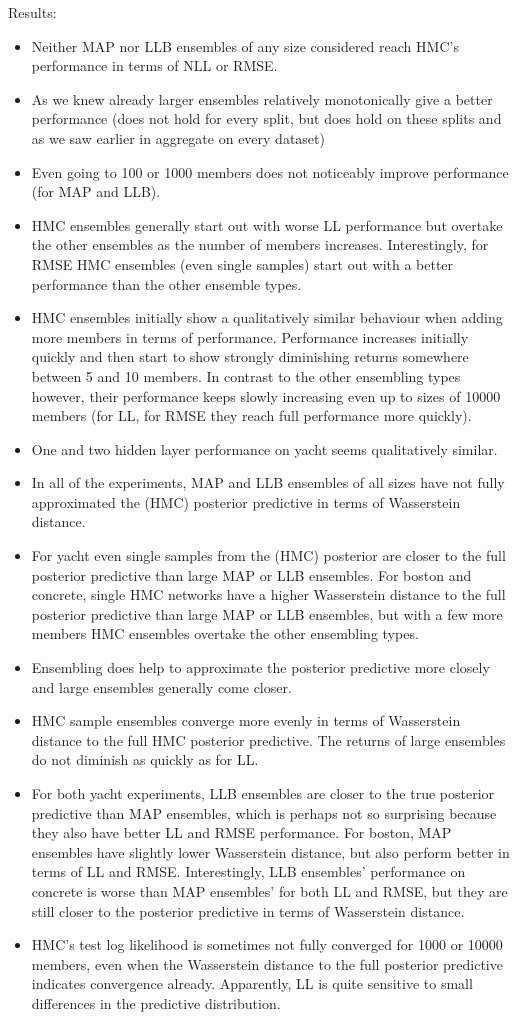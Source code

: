 \documentclass[../thesis.tex]{subfiles}
\begin{document}
Results:
\begin{itemize}
    \item Neither MAP nor LLB ensembles of any size considered reach HMC's performance in terms of NLL or RMSE.
    \item As we knew already larger ensembles relatively monotonically give a better performance (does not hold for every split, but does hold on these splits and as we saw earlier in aggregate on every dataset)
    \item Even going to 100 or 1000 members does not noticeably improve performance (for MAP and LLB).
    \item HMC ensembles generally start out with worse LL performance but overtake the other ensembles as the number of members increases. Interestingly, for RMSE HMC ensembles (even single samples) start out with a better performance than the other ensemble types.
    \item HMC ensembles initially show a qualitatively similar behaviour when adding more members in terms of performance. Performance increases initially quickly and then start to show strongly diminishing returns somewhere between 5 and 10 members. In contrast to the other ensembling types however, their performance keeps slowly increasing even up to sizes of 10000 members (for LL, for RMSE they reach full performance more quickly).
    \item One and two hidden layer performance on yacht seems qualitatively similar.
    \item In all of the experiments, MAP and LLB ensembles of all sizes have not fully approximated the (HMC) posterior predictive in terms of Wasserstein distance.
    \item For yacht even single samples from the (HMC) posterior are closer to the full posterior predictive than large MAP or LLB ensembles. For boston and concrete, single HMC networks have a higher Wasserstein distance to the full posterior predictive than large MAP or LLB ensembles, but with a few more members HMC ensembles overtake the other ensembling types.
    \item Ensembling does help to approximate the posterior predictive more closely and large ensembles generally come closer.
    \item HMC sample ensembles converge more evenly in terms of Wasserstein distance to the full HMC posterior predictive. The returns of large ensembles do not diminish as quickly as for LL.
    \item For both yacht experiments, LLB ensembles are closer to the true posterior predictive than MAP ensembles, which is perhaps not so surprising because they also have better LL and RMSE performance. For boston, MAP ensembles have slightly lower Wasserstein distance, but also perform better in terms of LL and RMSE. Interestingly, LLB ensembles' performance on concrete is worse than MAP ensembles' for both LL and RMSE, but they are still closer to the posterior predictive in terms of Wasserstein distance.
    \item HMC's test log likelihood is sometimes not fully converged for 1000 or 10000 members, even when the Wasserstein distance to the full posterior predictive indicates convergence already. Apparently, LL is quite sensitive to small differences in the predictive distribution.
\end{itemize}
\end{document}
